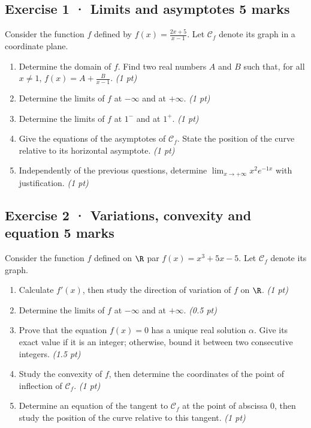 \subsection*{Exercise 1 · Limits and asymptotes \hfill 5 marks}Consider the function $f$ defined by $f(x)=\frac{2x+5}{x-1}$. Let $\mathcal C_f$ denote its graph in a coordinate plane.

\begin{enumerate}

\item Determine the domain of $f$. Find two real numbers $A$ and $B$ such that, for all $x\ne1$, $f(x)=A+\frac B{x-1}$. \hfill\textit{(1 pt)}

\item Determine the limits of $f$ at $-\infty$ and at $+\infty$. \hfill\textit{(1 pt)}

\item Determine the limits of $f$ at $1^-$ and at $1^+$. \hfill\textit{(1 pt)}

\item Give the equations of the asymptotes of $\mathcal C_f$. State the position of the curve relative to its horizontal asymptote. \hfill\textit{(1 pt)}

\item Independently of the previous questions, determine $\displaystyle\lim_{x\to+\infty}x^{2}e^{-1x}$ with justification. \hfill\textit{(1 pt)}

\end{enumerate}

\subsection*{Exercise 2 · Variations, convexity and equation \hfill 5 marks}Consider the function $f$ defined on $\R$ par $f(x)=x^3+5x-5$. Let $\mathcal C_f$ denote its graph.

\begin{enumerate}

\item Calculate $f'(x)$, then study the direction of variation of $f$ on $\R$. \hfill\textit{(1 pt)}

\item Determine the limits of $f$ at $-\infty$ and at $+\infty$. \hfill\textit{(0.5 pt)}

\item Prove that the equation $f(x)=0$ has a unique real solution $\alpha$. Give its exact value if it is an integer; otherwise, bound it between two consecutive integers. \hfill\textit{(1.5 pt)}

\item Study the convexity of $f$, then determine the coordinates of the point of inflection of $\mathcal C_f$. \hfill\textit{(1 pt)}

\item Determine an equation of the tangent to $\mathcal C_f$ at the point of abscissa $0$, then study the position of the curve relative to this tangent. \hfill\textit{(1 pt)}

\end{enumerate}

